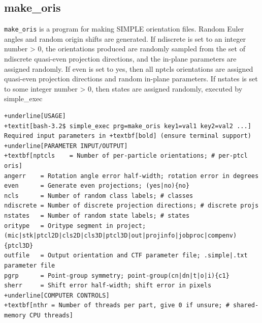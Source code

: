 \documentclass[a4paper,11pt]{article}
\newcommand{\prgname}[1]{\textcolor{NavyBlue}{\texttt{#1}}}
\begin{document}
\subsection{make\_oris}
\label{make_oris}
\prgname{make\_oris} is a program for making SIMPLE orientation files. Random Euler angles and random origin shifts are generated. If ndiscrete is set to an integer number > 0, the orientations produced are randomly sampled from the set of ndiscrete quasi-even projection directions, and the in-plane parameters are assigned randomly. If even is set to yes, then all nptcls orientations are assigned quasi-even projection directions and random in-plane parameters. If nstates is set to some integer number > 0, then states are assigned randomly, executed by simple\_exec
\begin{Verbatim}[commandchars=+\[\],fontsize=\small,breaklines=true]
+underline[USAGE]
+textit[bash-3.2$ simple_exec prg=make_oris key1=val1 key2=val2 ...]
Required input parameters in +textbf[bold] (ensure terminal support)
+underline[PARAMETER INPUT/OUTPUT]
+textbf[nptcls    = Number of per-particle orientations; # per-ptcl oris]
angerr    = Rotation angle error half-width; rotation error in degrees
even      = Generate even projections; (yes|no){no}
ncls      = Number of random class labels; # classes
ndiscrete = Number of discrete projection directions; # discrete projs
nstates   = Number of random state labels; # states
oritype   = Oritype segment in project; (mic|stk|ptcl2D|cls2D|cls3D|ptcl3D|out|projinfo|jobproc|compenv){ptcl3D}
outfile   = Output orientation and CTF parameter file; .simple|.txt parameter file
pgrp      = Point-group symmetry; point-group(cn|dn|t|o|i){c1}
sherr     = Shift error half-width; shift error in pixels
+underline[COMPUTER CONTROLS]
+textbf[nthr = Number of threads per part, give 0 if unsure; # shared-memory CPU threads]
\end{Verbatim}
\end{document}
